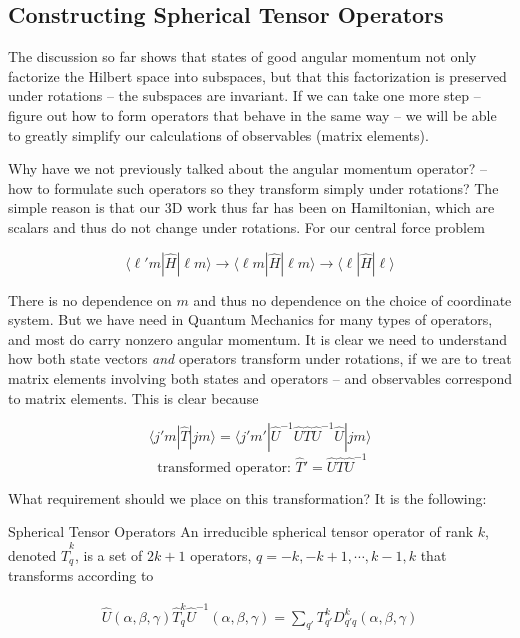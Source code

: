 \subsection{Constructing Spherical Tensor Operators}

The discussion so far shows that states of good angular momentum not only
factorize the Hilbert space into subspaces, but that this factorization is
preserved under rotations -- the subspaces are invariant. If we can take one
more step -- figure out how to form operators that behave in the same way -- we
will be able to greatly simplify our calculations of observables (matrix
elements). 

Why have we not previously talked about the angular momentum operator? -- how
to formulate such operators so they transform simply under rotations? The
simple reason is that our 3D work thus far has been on Hamiltonian, which are
scalars and thus do not change under rotations. For our central force problem 

\[
\langle \ell' m | \hat{H} | \ell m \rangle \rightarrow \langle \ell m | \hat{H}
| \ell m \rangle \rightarrow \langle \ell | \hat{H}|\ell\rangle 
\] \vspace{3px}

There is no dependence on $m$ and thus no dependence on the choice of
coordinate system. But we have need in Quantum Mechanics for many types of
operators, and most do carry nonzero angular momentum. It is clear we need to
understand how both state vectors \textit{and} operators transform under
rotations, if we are to treat matrix elements involving both states and
operators -- and observables correspond to matrix elements. This is clear
because 

\[
  \langle j' m | \hat{T}| jm \rangle = \langle j'm' | \hat{U}^{-1} \hat{U}
  \hat{T} \hat{U}^{-1} \hat{U} | jm \rangle
  \] \[ \text{ transformed operator: } \hat{T}' = \hat{U}\hat{T}\hat{U}^{-1} \] \vspace{3px}


What requirement should we place on this transformation? It is the following: 

\begin{mainbox}{Spherical Tensor Operators}
  An irreducible spherical tensor operator of rank  $k$, denoted $\hat{T}_q^k$,
  is a set of $2k+1$ operators, $q = -k, -k+1, \cdots, k-1, k$ that transforms
  according to 

  \begin{align} \hat{U}(\alpha, \beta, \gamma) \hat{T}_q^k \hat{U}^{-1}(\alpha, \beta,
    \gamma) = \sum_{q'}^{} T_{q'}^k D_{q'q}^k (\alpha, \beta,\gamma)
  \end{align}
\end{mainbox}

